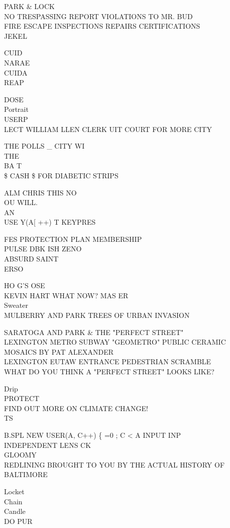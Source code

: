 \documentclass[10pt,letterpaper]{article}
\begin{document}
PARK \& LOCK\\
NO TRESPASSING REPORT VIOLATIONS TO MR. BUD\\
FIRE ESCAPE INSPECTIONS REPAIRS CERTIFICATIONS\\
JEKEL

CUID\\
NARAE\\
CUIDA\\
REAP

DOSE\\
Portrait\\
USERP\\
LECT WILLIAM LLEN CLERK UIT COURT FOR MORE CITY

THE POLLS \_ CITY WI\\
THE\\
BA T\\
\$ CASH \$ FOR DIABETIC STRIPS

ALM CHRIS THIS NO\\
OU WILL.\\
AN\\
USE Y(A{[} ++) T KEYPRES

FES PROTECTION PLAN MEMBERSHIP\\
PULSE DBK ISH ZENO\\
ABSURD SAINT\\
ERSO

HO G'S OSE\\
KEVIN HART WHAT NOW?  MAS ER\\
Sweater\\
MULBERRY AND PARK TREES OF URBAN INVASION

SARATOGA AND PARK \& THE "PERFECT STREET"\\
LEXINGTON METRO SUBWAY "GEOMETRO" PUBLIC CERAMIC MOSAICS BY PAT ALEXANDER\\
LEXINGTON EUTAW ENTRANCE PEDESTRIAN SCRAMBLE\\
WHAT DO YOU THINK A "PERFECT STREET" LOOKS LIKE?

Drip\\
PROTECT\\
FIND OUT MORE ON CLIMATE CHANGE!\\
TS

B.SPL NEW USER(A,  C++)  \{   =0 ; C < A INPUT INP\\
INDEPENDENT LENS CK\\
GLOOMY\\
REDLINING BROUGHT TO YOU BY THE ACTUAL HISTORY OF BALTIMORE

Locket\\
Chain\\
Candle\\
DO PUR
\end{document}
